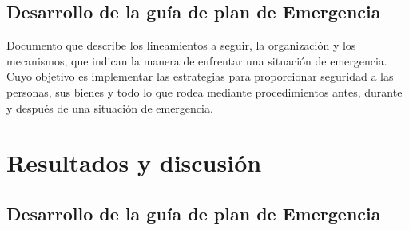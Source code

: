     
    \subsection{Desarrollo de la guía de plan de Emergencia}
    
    Documento que describe los lineamientos a seguir, la organización y los mecanismos, que indican la manera de enfrentar una situación de emergencia. Cuyo objetivo es implementar las estrategias para proporcionar seguridad a las personas, sus bienes y todo lo que rodea mediante procedimientos antes, durante y después de una situación de emergencia.
    
    
    
    
    
    
    
    
    \section{Resultados y discusión}
    
    \subsection{Desarrollo de la guía de plan de Emergencia}
    
